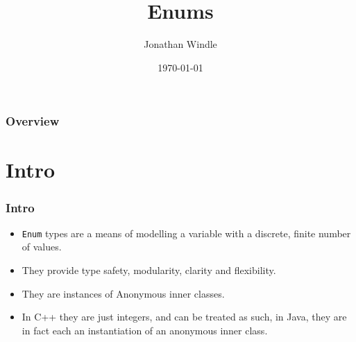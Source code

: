 \documentclass{beamer}
\title[Enums]{Enums} %
\author{Jonathan Windle} %
\institute[UEA] %
{
University of East Anglia \\ %
\medskip
\textit{J.Windle@uea.ac.uk} %
}
\date{\today} %
\begin{document}
\begin{frame}
\titlepage %
\end{frame}

\begin{frame}[allowframebreaks]
\frametitle{Overview} %
\tableofcontents %
\end{frame}
\section{Intro}
\begin{frame}
\frametitle{Intro}
\begin{itemize}
\item \texttt{Enum} types are a means of modelling a variable with a discrete, finite number of values.
\item They provide type safety, modularity, clarity and flexibility.
\item They are instances of {\color{red} Anonymous inner classes}.
\item In C++ they are just integers, and can be treated as such, in Java, they are in fact each an instantiation of an anonymous inner class.
\end{itemize}
\end{frame}
\end{document}
